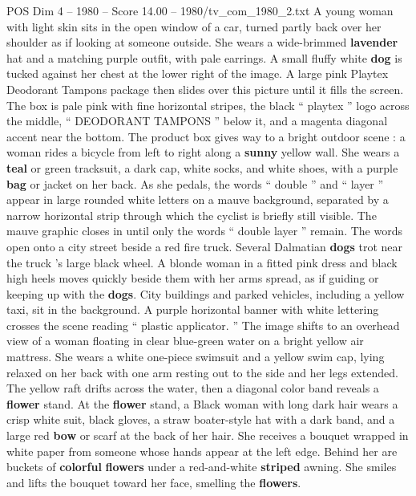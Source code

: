 \begin{textsample}{POS Dim 4 – 1980 – Score 14.00 – 1980/tv\_com\_1980\_2.txt}  \label{ex:f4_pos_046}
A young woman with light skin sits in the open window of a car, turned partly back over her shoulder as if looking at someone outside.
She wears a wide-brimmed \textbf{lavender} hat and a matching purple outfit, with pale earrings.
A small fluffy white \textbf{dog} is tucked against her chest at the lower right of the image.
A large pink Playtex Deodorant Tampons package then slides over this picture until it fills the screen.
The box is pale pink with fine horizontal stripes, the black “ playtex ” logo across the middle, “ DEODORANT TAMPONS ” below it, and a magenta diagonal accent near the bottom.
The product box gives way to a bright outdoor scene : a woman rides a bicycle from left to right along a \textbf{sunny} yellow wall.
She wears a \textbf{teal} or green tracksuit, a dark cap, white socks, and white shoes, with a purple \textbf{bag} or jacket on her back.
As she pedals, the words “ double ” and “ layer ” appear in large rounded white letters on a mauve background, separated by a narrow horizontal strip through which the cyclist is briefly still visible.
The mauve graphic closes in until only the words “ double layer ” remain.
The words open onto a city street beside a red fire truck.
Several Dalmatian \textbf{dogs} trot near the truck ’s large black wheel.
A blonde woman in a fitted pink dress and black high heels moves quickly beside them with her arms spread, as if guiding or keeping up with the \textbf{dogs}.
City buildings and parked vehicles, including a yellow taxi, sit in the background.
A purple horizontal banner with white lettering crosses the scene reading “ plastic applicator. ” The image shifts to an overhead view of a woman floating in clear blue-green water on a bright yellow air mattress.
She wears a white one-piece swimsuit and a yellow swim cap, lying relaxed on her back with one arm resting out to the side and her legs extended.
The yellow raft drifts across the water, then a diagonal color band reveals a \textbf{flower} stand.
At the \textbf{flower} stand, a Black woman with long dark hair wears a crisp white suit, black gloves, a straw boater-style hat with a dark band, and a large red \textbf{bow} or scarf at the back of her hair.
She receives a bouquet wrapped in white paper from someone whose hands appear at the left edge.
Behind her are buckets of \textbf{colorful} \textbf{flowers} under a red-and-white \textbf{striped} awning.
She smiles and lifts the bouquet toward her face, smelling the \textbf{flowers}.

\end{textsample}
